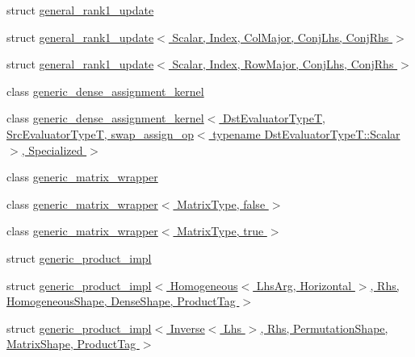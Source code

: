 \begin{DoxyCompactItemize}
\item 
struct \hyperlink{struct_eigen_1_1internal_1_1general__rank1__update}{general\+\_\+rank1\+\_\+update}
\item 
struct \hyperlink{struct_eigen_1_1internal_1_1general__rank1__update_3_01_scalar_00_01_index_00_01_col_major_00_01_conj_lhs_00_01_conj_rhs_01_4}{general\+\_\+rank1\+\_\+update$<$ Scalar, Index, Col\+Major, Conj\+Lhs, Conj\+Rhs $>$}
\item 
struct \hyperlink{struct_eigen_1_1internal_1_1general__rank1__update_3_01_scalar_00_01_index_00_01_row_major_00_01_conj_lhs_00_01_conj_rhs_01_4}{general\+\_\+rank1\+\_\+update$<$ Scalar, Index, Row\+Major, Conj\+Lhs, Conj\+Rhs $>$}
\item 
class \hyperlink{class_eigen_1_1internal_1_1generic__dense__assignment__kernel}{generic\+\_\+dense\+\_\+assignment\+\_\+kernel}
\item 
class \hyperlink{class_eigen_1_1internal_1_1generic__dense__assignment__kernel_3_01_dst_evaluator_type_t_00_01_sr759181e846694beea0b332c7e3bbe519}{generic\+\_\+dense\+\_\+assignment\+\_\+kernel$<$ Dst\+Evaluator\+Type\+T, Src\+Evaluator\+Type\+T, swap\+\_\+assign\+\_\+op$<$ typename Dst\+Evaluator\+Type\+T\+::\+Scalar $>$, Specialized $>$}
\item 
class \hyperlink{class_eigen_1_1internal_1_1generic__matrix__wrapper}{generic\+\_\+matrix\+\_\+wrapper}
\item 
class \hyperlink{class_eigen_1_1internal_1_1generic__matrix__wrapper_3_01_matrix_type_00_01false_01_4}{generic\+\_\+matrix\+\_\+wrapper$<$ Matrix\+Type, false $>$}
\item 
class \hyperlink{class_eigen_1_1internal_1_1generic__matrix__wrapper_3_01_matrix_type_00_01true_01_4}{generic\+\_\+matrix\+\_\+wrapper$<$ Matrix\+Type, true $>$}
\item 
struct \hyperlink{struct_eigen_1_1internal_1_1generic__product__impl}{generic\+\_\+product\+\_\+impl}
\item 
struct \hyperlink{struct_eigen_1_1internal_1_1generic__product__impl_3_01_homogeneous_3_01_lhs_arg_00_01_horizontae30a005e4f34a62ed132a21a8e333a29}{generic\+\_\+product\+\_\+impl$<$ Homogeneous$<$ Lhs\+Arg, Horizontal $>$, Rhs, Homogeneous\+Shape, Dense\+Shape, Product\+Tag $>$}
\item 
struct \hyperlink{struct_eigen_1_1internal_1_1generic__product__impl_3_01_inverse_3_01_lhs_01_4_00_01_rhs_00_01_pec7dcfbcd610060a544651ed47d5cce0c}{generic\+\_\+product\+\_\+impl$<$ Inverse$<$ Lhs $>$, Rhs, Permutation\+Shape, Matrix\+Shape, Product\+Tag $>$}

\end{DoxyCompactItemize}
